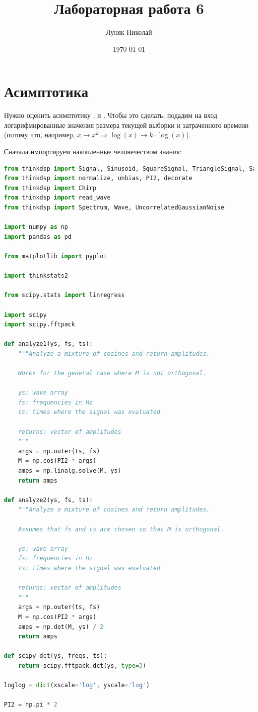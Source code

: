 \documentclass[a4paper,12pt]{report}
\author{Луняк Николай}
\title{Лабораторная работа 6}
\date{\today}
\begin{document}
    \maketitle
    \tableofcontents
    \listoffigures
    \lstlistoflistings
    
    \chapter{Асимптотика}
    
    Нужно оценить асимптотику ,  и . Чтобы это сделать, подадим на вход  логарифмированные значения размера текущей выборки и затраченного времени (потому что, например, $x \rightarrow x^k \Rightarrow \log(x) \rightarrow k\cdot \log(x)$).
    
    Сначала импортируем накопленные человечеством знания:
    
\begin{lstlisting}[language=Python,caption=Импорты]
from thinkdsp import Signal, Sinusoid, SquareSignal, TriangleSignal, SawtoothSignal, ParabolicSignal
from thinkdsp import normalize, unbias, PI2, decorate
from thinkdsp import Chirp
from thinkdsp import read_wave
from thinkdsp import Spectrum, Wave, UncorrelatedGaussianNoise

import numpy as np
import pandas as pd

from matplotlib import pyplot

import thinkstats2

from scipy.stats import linregress

import scipy
import scipy.fftpack

def analyze1(ys, fs, ts):
    """Analyze a mixture of cosines and return amplitudes.

    Works for the general case where M is not orthogonal.

    ys: wave array
    fs: frequencies in Hz
    ts: times where the signal was evaluated    

    returns: vector of amplitudes
    """
    args = np.outer(ts, fs)
    M = np.cos(PI2 * args)
    amps = np.linalg.solve(M, ys)
    return amps

def analyze2(ys, fs, ts):
    """Analyze a mixture of cosines and return amplitudes.

    Assumes that fs and ts are chosen so that M is orthogonal.

    ys: wave array
    fs: frequencies in Hz
    ts: times where the signal was evaluated    

    returns: vector of amplitudes
    """
    args = np.outer(ts, fs)
    M = np.cos(PI2 * args)
    amps = np.dot(M, ys) / 2
    return amps

def scipy_dct(ys, freqs, ts):
    return scipy.fftpack.dct(ys, type=3)

loglog = dict(xscale='log', yscale='log')

PI2 = np.pi * 2
\end{lstlisting}
\end{document}
